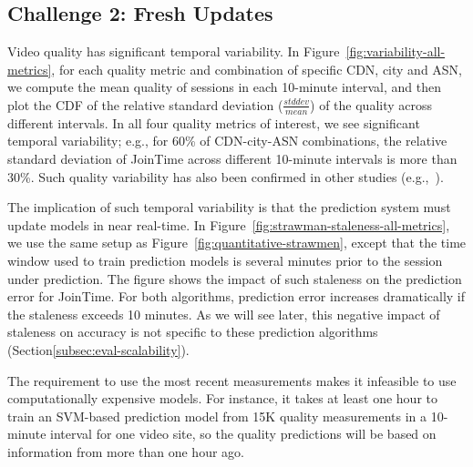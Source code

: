 \subsection{Challenge 2: Fresh Updates}
\label{subsec:fresh}

Video quality has significant temporal variability.
In Figure~\ref{fig:variability-all-metrics},
for each quality metric and combination of specific 
CDN, city and ASN, %
we compute the mean quality of sessions in each 
10-minute interval, and then plot the CDF of the 
relative standard deviation ($\frac{stddev}{mean}$)
of the quality across different intervals.
In all four quality metrics of interest, we see 
significant temporal variability;
e.g., for 60\% of CDN-city-ASN combinations, 
the relative standard deviation of JoinTime across 
different 10-minute intervals is more than 30\%.
Such quality variability has also been confirmed in 
other studies (e.g.,~\cite{sigcomm12}).

The implication of such temporal variability
is that the prediction system must update models 
in near real-time.
In Figure~\ref{fig:strawman-staleness-all-metrics}, 
we use the same setup as 
Figure~\ref{fig:quantitative-strawmen}, except that the 
time window used to train prediction models is 
several minutes prior to the session under prediction.
The figure shows the impact of such staleness on 
the prediction error for JoinTime. 
For both algorithms, prediction error increases 
dramatically if the staleness exceeds 10 minutes. 
As we will see later, this negative impact of staleness 
on accuracy is not specific to these prediction 
algorithms (Section\ref{subsec:eval-scalability}). 



The requirement to use the most recent measurements
makes it infeasible to use computationally expensive models.
For instance, it takes at least one 
hour to train an SVM-based prediction model from 15K
quality measurements in a 10-minute interval for 
one video site, so the quality predictions 
will be based on information from more than one hour ago.



